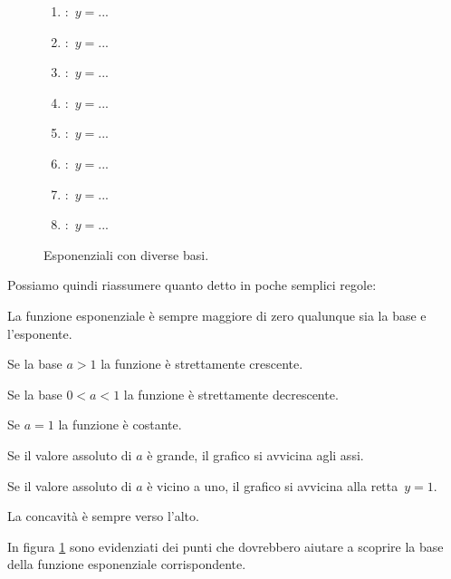 \vspace{5pt}

\begin{figure}[h]
\begin{minipage}{.69\textwidth}
 \begin{inaccessibleblock}
  \espdiversebasi
\end{inaccessibleblock}
\end{minipage}
\hspace{12pt}
\begin{minipage}{.20\textwidth}
 \begin{enumerate} [label=\alph*]
   \item :~$y=...$
   \item :~$y=...$
   \item :~$y=...$
   \item :~$y=...$
   \item :~$y=...$
   \item :~$y=...$
   \item :~$y=...$
   \item :~$y=...$
 \end{enumerate}
\end{minipage}
  \caption{Esponenziali con diverse basi.} \label{fig:diversebasi}
\end{figure}

Possiamo quindi riassumere quanto detto in poche semplici regole: 
\begin{enumerate*}
 \item La funzione esponenziale è sempre maggiore di zero qualunque sia la base 
e l'esponente.
 \item Se la base $a>1$ la funzione è strettamente crescente.
 \item Se la base $0<a<1$ la funzione è strettamente decrescente.
 \item Se $a=1$ la funzione è costante.
 \item Se il valore assoluto di $a$ è grande, il grafico si avvicina agli assi.
 \item Se il valore assoluto di $a$ è vicino a uno, il grafico si avvicina alla 
retta~\(y=1\).
 \item La concavità è sempre verso l'alto.
\end{enumerate*}

In figura \ref{fig:diversebasi} sono evidenziati dei punti che dovrebbero 
aiutare a scoprire la base della funzione esponenziale corrispondente.

